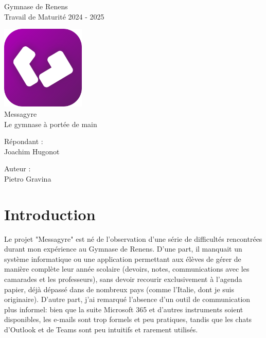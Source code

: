 \documentclass[12pt]{report}
\begin{document}
	
	\begin{titlepage}
		\centering
		
		{\Huge Gymnase de Renens\\[0.5em]}
		{\large Travail de Maturité 2024 - 2025}
		
		\vfill
		
		\includegraphics[width=4cm]{img/rounded_logo_full.png}\\[1em]
		{\Huge Messagyre\\[0.5em]}
		{\large Le gymnase à portée de main}
		
		\vfill
		
		\noindent
		\begin{minipage}[t]{0.48\textwidth}
			\RaggedRight
			Répondant :\\
			Joachim Hugonot
		\end{minipage}%
		\hfill
		\begin{minipage}[t]{0.48\textwidth}
			\RaggedLeft
			Auteur :\\
			Pietro Gravina
		\end{minipage}
	\end{titlepage}
	
	\renewcommand{\contentsname}{Table des matières}
	\tableofcontents
	
	\chapter{Introduction}
	
	Le projet "Messagyre" est né de l’observation d’une série de difficultés rencontrées durant mon expérience au Gymnase de Renens. D’une part, il manquait un système informatique ou une application permettant aux élèves de gérer de manière complète leur année scolaire (devoirs, notes, communications avec les camarades et les professeurs), sans devoir recourir exclusivement à l’agenda papier, déjà dépassé dans de nombreux pays (comme l’Italie, dont je suis originaire). D’autre part, j’ai remarqué l’absence d’un outil de communication plus informel: bien que la suite Microsoft 365 et d’autres instruments soient disponibles, les e-mails sont trop formels et peu pratiques, tandis que les chats d’Outlook et de Teams\supercite{teams} sont peu intuitifs et rarement utilisés.
	
\end{document}
